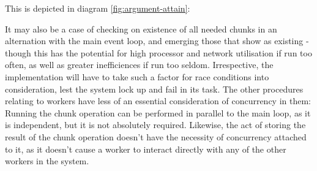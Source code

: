 This is depicted in diagram \cref{fig:argument-attain}:


It may also be a case of checking on existence of all needed chunks in
an alternation with the main event loop, and emerging those that show as
existing - though this has the potential for high processor and network
utilisation if run too often, as well as greater inefficiences if run
too seldom. Irrespective, the implementation will have to take such a
factor for race conditions into consideration, lest the system lock up
and fail in its task. The other procedures relating to workers have less
of an essential consideration of concurrency in them: Running the chunk
operation can be performed in parallel to the main loop, as it is
independent, but it is not absolutely required. Likewise, the act of
storing the result of the chunk operation doesn't have the necessity of
concurrency attached to it, as it doesn't cause a worker to interact
directly with any of the other workers in the system.

